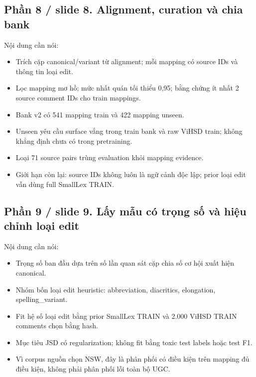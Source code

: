 \documentclass[11pt,a4paper]{article}
\begin{document}
\subsection*{Phần 8 / slide 8. Alignment, curation và chia bank}

Nội dung cần nói:


\begin{itemize}

\item Trích cặp canonical/variant từ alignment; mỗi mapping có source IDs và thông tin loại edit.

\item Lọc mapping mơ hồ; mức nhất quán tối thiểu 0,95; bằng chứng ít nhất 2 source comment IDs cho train mappings.

\item Bank v2 có 541 mapping train và 422 mapping unseen.

\item Unseen yêu cầu surface vắng trong train bank và raw ViHSD train; không khẳng định chưa có trong pretraining.

\item Loại 71 source pairs trùng evaluation khỏi mapping evidence.

\item Giới hạn còn lại: source IDs không luôn là ngữ cảnh độc lập; prior loại edit vẫn dùng full SmallLex TRAIN.

\end{itemize}

\subsection*{Phần 9 / slide 9. Lấy mẫu có trọng số và hiệu chỉnh loại edit}

Nội dung cần nói:


\begin{itemize}

\item Trọng số ban đầu dựa trên số lần quan sát cặp chia số cơ hội xuất hiện canonical.

\item Nhóm bốn loại edit heuristic: abbreviation, diacritics, elongation, spelling\_variant.

\item Fit hệ số loại edit bằng prior SmallLex TRAIN và 2.000 ViHSD TRAIN comments chọn bằng hash.

\item Mục tiêu JSD có regularization; không fit bằng toxic test labels hoặc test F1.

\item Vì corpus nguồn chọn NSW, đây là phân phối có điều kiện trên mapping đủ điều kiện, không phải phân phối lỗi toàn bộ UGC.

\end{itemize}
\end{document}
